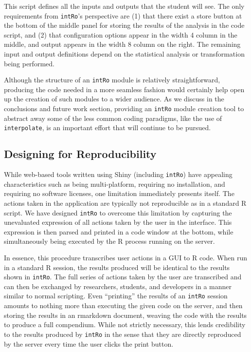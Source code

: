 \documentclass[12pt,]{article}
\begin{document}
This script defines all the inputs and outputs that the student will
see. The only requirements from \texttt{intRo}'s perspective are (1)
that there exist a store button at the bottom of the middle panel for
storing the results of the analysis in the code script, and (2) that
configuration options appear in the width 4 column in the middle, and
output appears in the width 8 column on the right. The remaining input
and output definitions depend on the statistical analysis or
transformation being performed.

Although the structure of an \texttt{intRo} module is relatively
straightforward, producing the code needed in a more seamless fashion
would certainly help open up the creation of such modules to a wider
audience. As we discuss in the conclusions and future work section,
providing an \texttt{intRo} module creation tool to abstract away some
of the less common coding paradigms, like the use of
\texttt{interpolate}, is an important effort that will continue to be
pursued.

\subsection{Designing for
Reproducibility}\label{designing-for-reproducibility}

While web-based tools written using Shiny (including \texttt{intRo})
have appealing characteristics such as being multi-platform, requiring
no installation, and requiring no software licenses, one limitation
immediately presents itself. The actions taken in the application are
typically not reproducible as in a standard R script. We have designed
\texttt{intRo} to overcome this limitation by capturing the unevaluated
expression of all actions taken by the user in the interface. This
expression is then parsed and printed in a code window at the bottom,
while simultaneously being executed by the R process running on the
server.

In essence, this procedure transcribes user actions in a GUI to R code.
When run in a standard R session, the results produced will be identical
to the results shown in \texttt{intRo}. The full series of actions taken
by the user are transcribed and can then be exchanged by researchers,
students, and developers in a manner similar to normal scripting. Even
``printing'' the results of an \texttt{intRo} session amounts to nothing
more than executing the given code on the server, and then storing the
results in an rmarkdown document, weaving the code with the results to
produce a full compendium. While not strictly necessary, this lends
credibility to the results produced by \texttt{intRo} in the sense that
they are directly reproduced by the server every time the user clicks
the print button.
\end{document}
